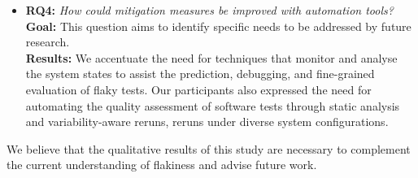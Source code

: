 \begin{itemize}[label={}]
\item \textbf{\textsc{RQ4:}} \emph{How could mitigation measures be improved with automation tools?}\\
    \textbf{Goal:} This question aims to identify specific needs to be addressed by future research. \\
    \textbf{Results:} We accentuate the need for techniques that monitor and analyse the system states to assist the prediction, debugging, and fine-grained evaluation of flaky tests.
    Our participants also expressed the need for automating the quality assessment of software tests through static analysis and variability-aware reruns, \ie reruns under diverse system configurations. 
\end{itemize}

We believe that the qualitative results of this study are necessary to complement the current understanding of flakiness and advise future work.  
